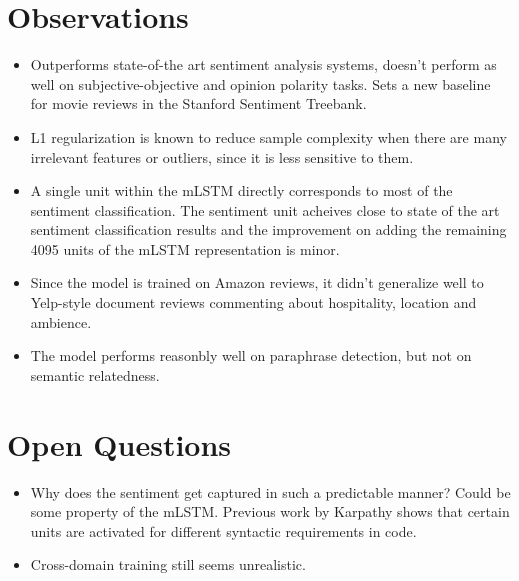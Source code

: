 \documentclass[12pt]{scrartcl}
\begin{document}
\section{Observations}
  \begin{itemize}
    \item Outperforms state-of-the art sentiment analysis systems, doesn't perform as well on subjective-objective and opinion polarity tasks. Sets a new baseline for movie reviews in the Stanford Sentiment Treebank.
    \item L1 regularization is known to reduce sample complexity when there are
    many irrelevant features or outliers, since it is less sensitive to them.
    \item A single unit within the mLSTM directly corresponds to most of the sentiment classification. The sentiment unit acheives close to state of the art sentiment classification results and the improvement on adding the remaining 4095 units of the mLSTM representation is minor.
    \item Since the model is trained on Amazon reviews, it didn't generalize well to Yelp-style document reviews commenting about hospitality, location and ambience.
    \item The model performs reasonbly well on paraphrase detection, but not on semantic relatedness.
  \end{itemize}

\section{Open Questions}
  \begin{itemize}
    \item Why does the sentiment get captured in such a predictable manner? Could be some property of the mLSTM. Previous work by Karpathy \cite{karpathy2015visualizing} shows that certain units are activated for different syntactic requirements in code.
    \item Cross-domain training still seems unrealistic.
  \end{itemize}



\end{document}
